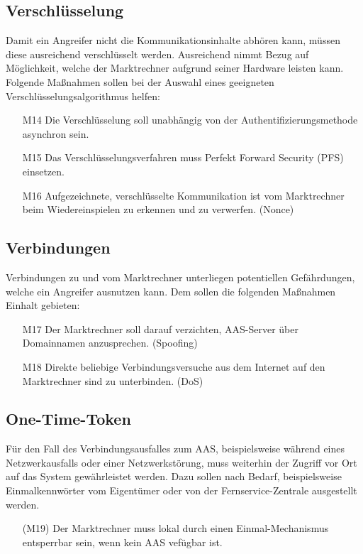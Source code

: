 \documentclass[11pt,a4paper]{report}
\begin{document}
\subsection{Verschlüsselung}
Damit ein Angreifer nicht die Kommunikationsinhalte abhören kann, müssen diese ausreichend verschlüsselt werden. Ausreichend nimmt Bezug auf Möglichkeit, welche der Marktrechner aufgrund seiner Hardware leisten kann. Folgende Maßnahmen sollen bei der Auswahl eines geeigneten Verschlüsselungsalgorithmus helfen:

\begin{enumerate}
\item[M14] Die Verschlüsselung soll unabhängig von der Authentifizierungsmethode asynchron sein.
\item[M15] Das Verschlüsselungsverfahren muss Perfekt Forward Security (PFS) einsetzen.
\item[M16] Aufgezeichnete, verschlüsselte Kommunikation ist vom Marktrechner beim Wiedereinspielen zu erkennen und zu verwerfen. (Nonce)
\end{enumerate}

\subsection{Verbindungen}
Verbindungen zu und vom Marktrechner unterliegen potentiellen Gefährdungen, welche ein Angreifer ausnutzen kann. Dem sollen die folgenden Maßnahmen Einhalt gebieten:

\begin{enumerate}
\item[M17] Der Marktrechner soll darauf verzichten, AAS-Server über Domainnamen anzusprechen. (Spoofing)
\item[M18] Direkte beliebige Verbindungsversuche aus dem Internet auf den Marktrechner sind zu unterbinden. (DoS)
\end{enumerate}

\subsection{One-Time-Token}
Für den Fall des Verbindungsausfalles zum AAS, beispielsweise während eines Netzwerkausfalls oder einer Netzwerkstörung, muss weiterhin der Zugriff vor Ort auf das System gewährleistet werden. Dazu sollen nach Bedarf, beispielsweise Einmalkennwörter vom Eigentümer oder von der Fernservice-Zentrale ausgestellt werden.

\begin{enumerate}
\item[(M19)] Der Marktrechner muss lokal durch einen Einmal-Mechanismus entsperrbar sein, wenn kein AAS vefügbar ist.
\end{enumerate}
\end{document}

